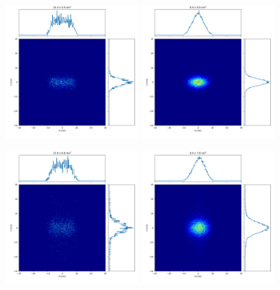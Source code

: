 \documentclass{iucr}              %
\begin{document}
\begin{figure}
\label{fig:ray tracing}
\centering
\includegraphics[width=0.45\textwidth]{GRAPHICS/idealelementsESRF.png}
\includegraphics[width=0.45\textwidth]{GRAPHICS/idealelementsEBS.png}

\includegraphics[width=0.45\textwidth]{GRAPHICS/hybridnoerrorsESRF.png}
\includegraphics[width=0.45\textwidth]{GRAPHICS/hybridnoerrorsEBS.png}


\end{figure}
\end{document}
